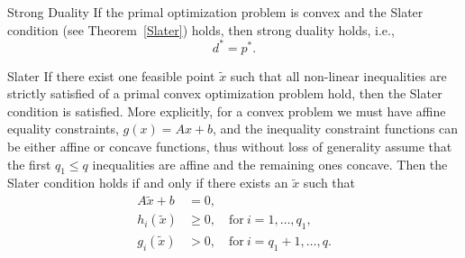 \begin{theo}{Strong Duality}
    \vspace*{-0.1cm}
    If the primal optimization problem is convex and the Slater condition (see Theorem~\ref{Slater}) holds, then strong duality holds, i\@.e\@.,
    \begin{equation*}
        d^* = p^*.
    \end{equation*}
    \vspace{-0.7cm}
\end{theo}

\begin{theo}{Slater}    
    If there exist one feasible point $\tilde{x}$ such that all non-linear inequalities are strictly satisfied of a primal convex optimization problem hold, then the Slater condition is satisfied. More explicitly, for a convex problem we must have affine equality constraints, $g(x) = Ax + b$, and the inequality constraint functions can be either affine or concave functions, thus without loss of generality assume that the first $q_1 \leq q$ inequalities are affine and the remaining ones concave. Then the Slater condition holds if and only if there exists an $\tilde{x}$ such that
    \begin{align*}
        A\tilde{x} + b &= 0, \\
        h_i(\tilde{x}) &\geq 0, \quad \text{for} \ i = 1, \ldots, q_1, \\
        g_i(\tilde{x}) &> 0, \quad \text{for} \ i = q_1 + 1, \ldots, q. 
    \end{align*}
    \vspace*{-0.5cm}
\end{theo}
